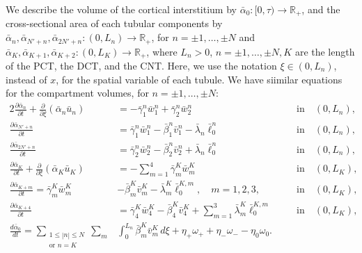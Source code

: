 \documentclass{article}
\begin{document}
We describe the volume of the cortical interstitium by $\bar{\alpha}_0:[0,\tau)\to \mathbb{R}_+$, and the cross-sectional area of each tubular components by $\bar{\alpha}_{n},\bar{\alpha}_{N'+n},\bar{\alpha}_{2N'+n}:(0,L_n)\to \mathbb{R}_+$, for $n=\pm 1,\dots,\pm N$ and $\bar{\alpha}_K,\bar{\alpha}_{K+1},\bar{\alpha}_{K+2}:(0,L_K)\to \mathbb{R}_+$, where $L_n>0$, $n=\pm 1,\dots,\pm N,K$ are the length of the PCT, the DCT, and the CNT.
Here, we use the notation $\xi\in(0,L_n)$, instead of $x$, for the spatial variable of each tubule.
We have siimilar equations for the compartment volumes, for $n=\pm 1,\dots,\pm N$:
\begin{alignat}{2}
    \frac{\partial \bar{\alpha}_n}{\partial t} + \frac{\partial}{\partial \xi}(\bar{\alpha}_n\bar{u}_n) &= -\bar{\gamma}_1^n\bar{w}_{1}^n+\bar{\gamma}_2^n\bar{w}_{2}^n\quad \quad \quad \ \  &&\text{in}\quad (0,L_n),\\
    \frac{\partial \bar{\alpha}_{N'+n}}{\partial t} &= \bar{\gamma}_1^n\bar{w}_{1}^n-\bar{\beta}_1^n\bar{v}_1^n-\bar{\lambda}_n\bar{\ell}_0^n\quad  &&\text{in}\quad (0,L_n),\\
    \frac{\partial \bar{\alpha}_{2N'+n}}{\partial t} &= \bar{\gamma}_2^n\bar{w}_{2}^n-\bar{\beta}_2^n\bar{v}_2^n+\bar{\lambda}_n\bar{\ell}_0^n\quad  &&\text{in}\quad (0,L_n),\\
    \frac{\partial \bar{\alpha}_K}{\partial t} + \frac{\partial}{\partial \xi}(\bar{\alpha}_K\bar{u}_K) &= -\sum_{m=1}^4\bar{\gamma}_m^K\bar{w}_{m}^K \qquad \quad \ \ \ \,  &&\text{in}\quad (0,L_K),\\
    \frac{\partial \bar{\alpha}_{K+m}}{\partial t} = \bar{\gamma}_m^K\bar{w}_{m}^K&-\bar{\beta}_m^K\bar{v}_m^K-\bar{\lambda}_m^K\bar{\ell}_0^{K,m},\quad m=1,2,3,\quad  &&\text{in}\quad (0,L_K),\\
    \frac{\partial \bar{\alpha}_{K+4}}{\partial t} &= \bar{\gamma}_4^K\bar{w}_4^K-\bar{\beta}_4^K\bar{v}_4^K+\sum_{m=1}^3\bar{\lambda}_m^K\bar{\ell}_0^{K,m}\quad  &&\text{in}\quad (0,L_K),\\
    \frac{d \bar{\alpha}_0}{d t} = 
        \sum_{\substack{1\leq|n|\leq N\\ \text{or } n=K}}\sum_m&\int_0^{L_n}\bar{\beta}_m^K\bar{v}_m^K\,d\xi+\eta_+\omega_++\eta_-\omega_--\eta_0\omega_0.
\end{alignat}
\end{document}
